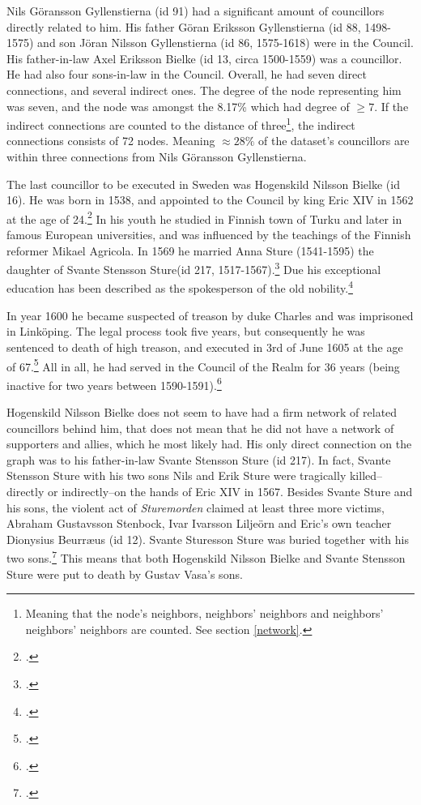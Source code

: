 Nils Göransson Gyllenstierna (id 91) had a significant amount of councillors directly related to him. His father Göran Eriksson Gyllenstierna (id 88, 1498-1575) and son Jöran Nilsson Gyllenstierna (id 86, 1575-1618) were in the Council. His father-in-law Axel Eriksson Bielke (id 13, circa 1500-1559) was a councillor. He had also four sons-in-law in the Council. Overall, he had seven direct connections, and several indirect ones. The degree of the node representing him was seven, and the node was amongst the 8.17\% which had degree of $\geq 7$. If the indirect connections are counted to the distance of three\footnote{Meaning that the node's neighbors, neighbors' neighbors and neighbors' neighbors' neighbors are counted. See section \ref{network}.}, the indirect connections consists of 72 nodes. Meaning $\approx 28 \%$ of the dataset's councillors are within three connections from Nils Göransson Gyllenstierna.

The last councillor to be executed in Sweden was Hogenskild Nilsson Bielke (id 16). He was born in 1538, and appointed to the Council by king Eric XIV in 1562 at the age of 24.\footcites[p. 58.]{HakanenAKoskinen2017}{councillorsDS} In his youth he studied in Finnish town of Turku and later in famous European universities, and was influenced by the teachings of the Finnish reformer Mikael Agricola. In 1569 he married Anna Sture (1541-1595) the daughter of Svante Stensson Sture(id 217, 1517-1567).\footcite{sbl_bielke_hongeskild} Due his exceptional education has been described as the spokesperson of the old nobility.\footcite[p. 55.]{lappalainen09}

In year 1600 he became suspected of treason by duke Charles and was imprisoned in Linköping. The legal process took five years, but consequently he was sentenced to death of high treason, and executed in 3rd of June 1605 at the age of 67.\footcite{sbl_bielke_hongeskild} All in all, he had served in the Council of the Realm for 36 years (being inactive for two years between 1590-1591).\footcite{councillorsDS}

Hogenskild Nilsson Bielke does not seem to have had a firm network of related councillors behind him, that does not mean that he did not have a network of supporters and allies, which he most likely had. His only direct connection on the graph was to his father-in-law Svante Stensson Sture (id 217). In fact, Svante Stensson Sture with his two sons Nils and Erik Sture were tragically killed–directly or indirectly–on the hands of Eric XIV in 1567. Besides Svante Sture and his sons, the violent act of \textit{Sturemorden} claimed at least three more victims, Abraham Gustavsson Stenbock, Ivar Ivarsson Liljeörn and Eric's own teacher Dionysius Beurræus (id 12). Svante Sturesson Sture was buried together with his two sons.\footcite{sbl_svante_sture} This means that both Hogenskild Nilsson Bielke and Svante Stensson Sture were put to death by Gustav Vasa's sons.

